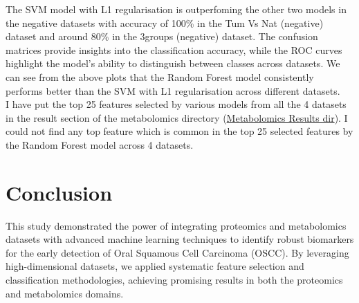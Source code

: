 \documentclass[a4paper,12pt]{article}
\begin{document}
The SVM model with L1 regularisation is outperfoming the other two models in the negative datasets with accuracy of 100\% in the Tum Vs Nat (negative) dataset and around 80\% in the 3groups (negative) dataset.
The confusion matrices provide insights into the classification accuracy, while the ROC curves highlight the model's ability to distinguish between classes across datasets. We can see from the above plots that the Random Forest model consistently performs better than the SVM with L1 regularisation across different datasets.\\
I have put the top 25 features selected by various models from all the 4 datasets in the result section of the metabolomics directory (\href{https://github.com/soumitra1854/OSCC-Biomarker-Identification-RnD/tree/main/metabolomics/results}{Metabolomics Results dir}). I could not find any top feature which is common in the top 25 selected features by the Random Forest model across 4 datasets.

\section{Conclusion}
This study demonstrated the power of integrating proteomics and metabolomics datasets with advanced machine learning techniques to identify robust biomarkers for the early detection of Oral Squamous Cell Carcinoma (OSCC). By leveraging high-dimensional datasets, we applied systematic feature selection and classification methodologies, achieving promising results in both the proteomics and metabolomics domains.
\end{document}
